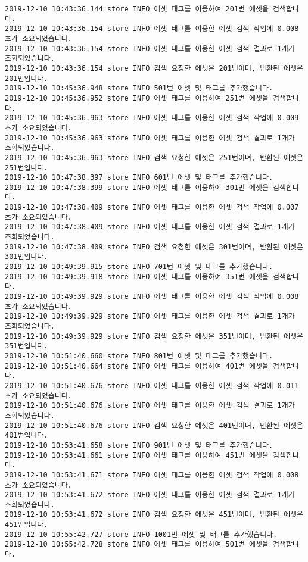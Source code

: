 \begin{Verbatim}[fontsize=\tiny, breaklines=true, breakanywhere=true]
2019-12-10 10:43:36.144 store INFO 에셋 태그를 이용하여 201번 에셋을 검색합니다.
2019-12-10 10:43:36.154 store INFO 에셋 태그를 이용한 에셋 검색 작업에 0.008초가 소요되었습니다.
2019-12-10 10:43:36.154 store INFO 에셋 태그를 이용한 에셋 검색 결과로 1개가 조회되었습니다.
2019-12-10 10:43:36.154 store INFO 검색 요청한 에셋은 201번이며, 반환된 에셋은 201번입니다.
2019-12-10 10:45:36.948 store INFO 501번 에셋 및 태그를 추가했습니다.
2019-12-10 10:45:36.952 store INFO 에셋 태그를 이용하여 251번 에셋을 검색합니다.
2019-12-10 10:45:36.963 store INFO 에셋 태그를 이용한 에셋 검색 작업에 0.009초가 소요되었습니다.
2019-12-10 10:45:36.963 store INFO 에셋 태그를 이용한 에셋 검색 결과로 1개가 조회되었습니다.
2019-12-10 10:45:36.963 store INFO 검색 요청한 에셋은 251번이며, 반환된 에셋은 251번입니다.
2019-12-10 10:47:38.397 store INFO 601번 에셋 및 태그를 추가했습니다.
2019-12-10 10:47:38.399 store INFO 에셋 태그를 이용하여 301번 에셋을 검색합니다.
2019-12-10 10:47:38.409 store INFO 에셋 태그를 이용한 에셋 검색 작업에 0.007초가 소요되었습니다.
2019-12-10 10:47:38.409 store INFO 에셋 태그를 이용한 에셋 검색 결과로 1개가 조회되었습니다.
2019-12-10 10:47:38.409 store INFO 검색 요청한 에셋은 301번이며, 반환된 에셋은 301번입니다.
2019-12-10 10:49:39.915 store INFO 701번 에셋 및 태그를 추가했습니다.
2019-12-10 10:49:39.918 store INFO 에셋 태그를 이용하여 351번 에셋을 검색합니다.
2019-12-10 10:49:39.929 store INFO 에셋 태그를 이용한 에셋 검색 작업에 0.008초가 소요되었습니다.
2019-12-10 10:49:39.929 store INFO 에셋 태그를 이용한 에셋 검색 결과로 1개가 조회되었습니다.
2019-12-10 10:49:39.929 store INFO 검색 요청한 에셋은 351번이며, 반환된 에셋은 351번입니다.
2019-12-10 10:51:40.660 store INFO 801번 에셋 및 태그를 추가했습니다.
2019-12-10 10:51:40.664 store INFO 에셋 태그를 이용하여 401번 에셋을 검색합니다.
2019-12-10 10:51:40.676 store INFO 에셋 태그를 이용한 에셋 검색 작업에 0.011초가 소요되었습니다.
2019-12-10 10:51:40.676 store INFO 에셋 태그를 이용한 에셋 검색 결과로 1개가 조회되었습니다.
2019-12-10 10:51:40.676 store INFO 검색 요청한 에셋은 401번이며, 반환된 에셋은 401번입니다.
2019-12-10 10:53:41.658 store INFO 901번 에셋 및 태그를 추가했습니다.
2019-12-10 10:53:41.661 store INFO 에셋 태그를 이용하여 451번 에셋을 검색합니다.
2019-12-10 10:53:41.671 store INFO 에셋 태그를 이용한 에셋 검색 작업에 0.008초가 소요되었습니다.
2019-12-10 10:53:41.672 store INFO 에셋 태그를 이용한 에셋 검색 결과로 1개가 조회되었습니다.
2019-12-10 10:53:41.672 store INFO 검색 요청한 에셋은 451번이며, 반환된 에셋은 451번입니다.
2019-12-10 10:55:42.727 store INFO 1001번 에셋 및 태그를 추가했습니다.
2019-12-10 10:55:42.728 store INFO 에셋 태그를 이용하여 501번 에셋을 검색합니다.

\end{Verbatim}
